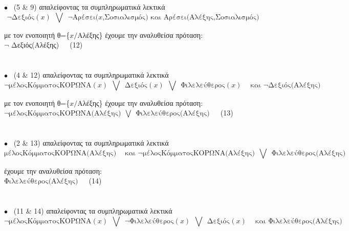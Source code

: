 \documentclass[10pt]{article}
\begin{document}
$\bullet$ \ (5 \&  9) απαλείφοντας τα συμπληρωματικά λεκτικά  \\
\[ \neg \text{Δεξιός}(x) \ \ \bigvee     \ \ \neg \text{Αρέσει($x$,Σοσιαλισμός) \ και \ } \text{Αρέσει(Αλέξης,Σοσιαλισμός)} \] 

\hspace{5mm} με τον ενοποιητή θ=\{$x/$Αλέξης\} έχουμε την αναλυθείσα πρόταση: \\

\hspace{60mm} $\neg$ Δεξιός(Αλέξης)\ \ \  (12) \\ \\  \\

$\bullet$ \ (4 \&  12) απαλείφοντας τα συμπληρωματικά λεκτικά  \\
\[ \neg \text{μέλοςΚόμματοςΚΟΡΩΝΑ}(x) \ \ \bigvee \ \ \text{Δεξιός}(x)  \ \  \bigvee  \ \ \text{Φιλελεύθερος}(x) \  \ \ \ \text{ και \ \ \ \ }  \neg \text{Δεξιός(Αλέξης)} \] 

\hspace{5mm} με τον ενοποιητή θ=\{$x/$Αλέξης\} έχουμε την αναλυθείσα πρόταση: \\

\hspace{40mm} $\neg \text{μέλοςΚόμματοςΚΟΡΩΝΑ(Αλέξης)} \ \  \bigvee  \ \ \text{Φιλελεύθερος(Αλέξης)}$\ \ \  (13) \\ \\  \\

$\bullet$ \ (2 \&  13) απαλείφοντας τα συμπληρωματικά λεκτικά  \\
\[  \text{μέλοςΚόμματοςΚΟΡΩΝΑ(Αλέξης)} \ \ \ \ \text{ και \ \ \ \ }  \neg \text{μέλοςΚόμματοςΚΟΡΩΝΑ(Αλέξης)} \ \  \bigvee  \ \ \text{Φιλελεύθερος(Αλέξης)} \] 

\hspace{5mm} έχουμε την αναλυθείσα πρόταση: \\

\hspace{40mm} $\text{Φιλελεύθερος(Αλέξης)}$\ \ \  (14) \\ \\  \\

$\bullet$ \ (11 \&  14) απαλείφοντας τα συμπληρωματικά λεκτικά  \\
\[ \neg \text{μέλοςΚόμματοςΚΟΡΩΝΑ}(x) \ \ \bigvee \ \ \neg \text{Φιλελεύθερος}(x)  \ \  \bigvee  \ \ \text{Δεξιός}(x) \  \ \ \ \text{ και \ \ \ \ }  \text{Φιλελεύθερος(Αλέξης)} \] 
\end{document}
